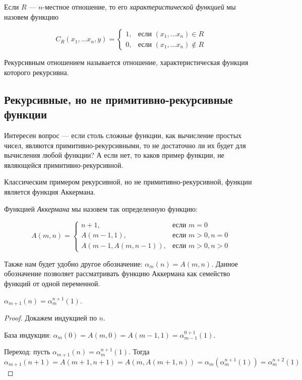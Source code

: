 \begin{definition}
Если $R$ --- $n$-местное отношение, то его \emph{характеристической функцией}
мы назовем функцию 

$$C_R(x_1,\dots x_n,y) = \left\{\begin{array}{rl}
    1, & \mbox{если $(x_1,\dots x_n) \in R$}\\
    0, & \mbox{если $(x_1,\dots x_n) \notin R$}
\end{array}\right.$$
\end{definition}

\begin{definition}
Рекурсивным отношением называется отношение, характеристическая функция
которого рекурсивна.
\end{definition}

\subsection{Рекурсивные, но не примитивно-рекурсивные функции}

Интересен вопрос --- если столь сложные функции, как вычисление простых
чисел, являются примитивно-рекурсивными, то не достаточно ли их будет
для вычисления любой функции? А если нет, то каков пример функции, не 
являющейся примитивно-рекурсивной.

Классическим примером рекурсивной, но не примитивно-рекурсивной, функции 
является функция Аккермана.
                    
\begin{definition}Функцией \emph{Аккермана} мы назовем так определенную 
функцию:

$$A(m,n) = \left\{\begin{array}{rl}
   n+1, & \mbox{если $m = 0$}\\
   A(m-1,1), & \mbox{если $m > 0, n = 0$}\\
   A(m-1,A(m,n-1)), & \mbox{если $m > 0, n > 0$}
\end{array}\right.$$

Также нам будет удобно другое обозначение: $\alpha_m(n) = A(m,n)$. 
Данное обозначение позволяет рассматривать функцию Аккермана как семейство
функций от одной переменной.
\end{definition}

\begin{lemma}$\alpha_{m+1}(n) = \alpha^{n+1}_m(1)$.
\end{lemma}
\begin{proof}
Докажем индукцией по $n$. 

База индукции: $\alpha_m(0) = A(m,0) = A(m-1,1) = \alpha^{0+1}_{m-1}(1)$.

Переход: пусть $\alpha_{m+1}(n) = \alpha^{n+1}_m(1)$. Тогда 
$\alpha_{m+1}(n+1) = A(m+1,n+1) = A(m,A(m+1,n)) = \alpha_m(\alpha^{n+1}_m(1)) = 
\alpha^{n+2}_m(1)$
\end{proof}

